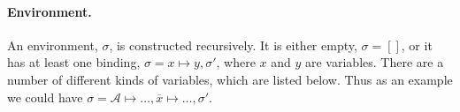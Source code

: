 
\paragraph{Environment.}
An environment, $\sigma$, is constructed recursively. It is either empty,
$\sigma = []$, or it has at least one binding, $\sigma = x \mapsto y, \sigma'$,
where $x$ and $y$ are variables. There are a number of different kinds of
variables, which are listed below. Thus as an example we could have $\sigma =
\mathcal{A} \mapsto \ldots, \overline{x} \mapsto \ldots, \sigma'$.

